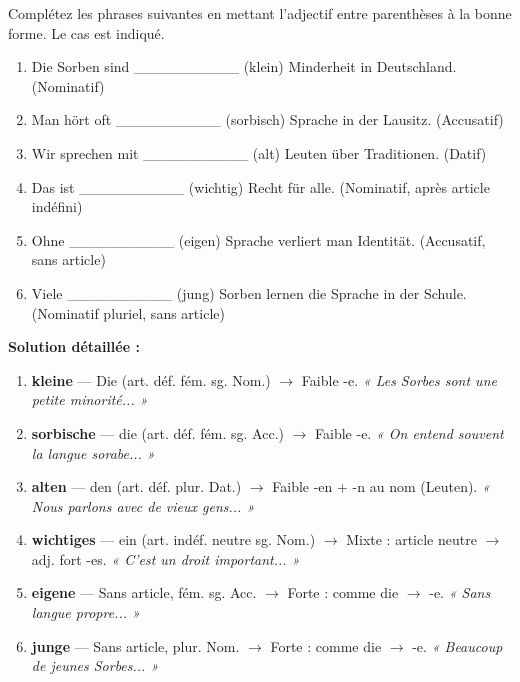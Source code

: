 \documentclass[11pt]{article}
\newcommand{\cle}[1]{{\popxbold\color{popdark}#1}}
\begin{document}
\begin{exoresolu}
Complétez les phrases suivantes en mettant l'adjectif entre parenthèses à la bonne forme. Le cas est indiqué.

\begin{enumerate}
    \item Die Sorben sind \_\_\_\_\_\_\_\_\_\_ (klein) Minderheit in Deutschland. (Nominatif)
    \item Man hört oft \_\_\_\_\_\_\_\_\_\_ (sorbisch) Sprache in der Lausitz. (Accusatif)
    \item Wir sprechen mit \_\_\_\_\_\_\_\_\_\_ (alt) Leuten über Traditionen. (Datif)
    \item Das ist \_\_\_\_\_\_\_\_\_\_ (wichtig) Recht für alle. (Nominatif, après article indéfini)
    \item Ohne \_\_\_\_\_\_\_\_\_\_ (eigen) Sprache verliert man Identität. (Accusatif, sans article)
    \item Viele \_\_\_\_\_\_\_\_\_\_ (jung) Sorben lernen die Sprache in der Schule. (Nominatif pluriel, sans article)
\end{enumerate}

\tcblower
\textbf{Solution détaillée :}
\begin{enumerate}
    \item \textbf{kleine} — \cle{Die} (art. déf. fém. sg. Nom.) $\rightarrow$ Faible \cle{-e}. \textit{« Les Sorbes sont une petite minorité... »}
    \item \textbf{sorbische} — \cle{die} (art. déf. fém. sg. Acc.) $\rightarrow$ Faible \cle{-e}. \textit{« On entend souvent la langue sorabe... »}
    \item \textbf{alten} — \cle{den} (art. déf. plur. Dat.) $\rightarrow$ Faible \cle{-en} + \cle{-n} au nom (\cle{Leuten}). \textit{« Nous parlons avec de vieux gens... »}
    \item \textbf{wichtiges} — \cle{ein} (art. indéf. neutre sg. Nom.) $\rightarrow$ Mixte : article neutre $\rightarrow$ adj. fort \cle{-es}. \textit{« C'est un droit important... »}
    \item \textbf{eigene} — Sans article, fém. sg. Acc. $\rightarrow$ Forte : comme \cle{die} $\rightarrow$ \cle{-e}. \textit{« Sans langue propre... »}
    \item \textbf{junge} — Sans article, plur. Nom. $\rightarrow$ Forte : comme \cle{die} $\rightarrow$ \cle{-e}. \textit{« Beaucoup de jeunes Sorbes... »}
\end{enumerate}
\end{exoresolu}
\end{document}
